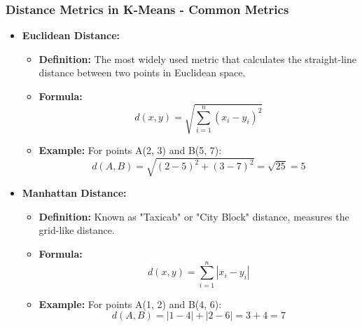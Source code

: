 \documentclass[aspectratio=169]{beamer}
\begin{document}
\begin{frame}[fragile]
    \frametitle{Distance Metrics in K-Means - Common Metrics}
    \begin{itemize}
        \item \textbf{Euclidean Distance:}
        \begin{itemize}
            \item \textbf{Definition:} The most widely used metric that calculates the straight-line distance between two points in Euclidean space.
            \item \textbf{Formula:}
            \begin{equation}
            d(x, y) = \sqrt{\sum_{i=1}^{n} (x_i - y_i)^2}
            \end{equation}
            \item \textbf{Example:} For points A(2, 3) and B(5, 7):
            \begin{equation}
            d(A, B) = \sqrt{(2-5)^2 + (3-7)^2} = \sqrt{25} = 5
            \end{equation}
        \end{itemize}
        
        \item \textbf{Manhattan Distance:}
        \begin{itemize}
            \item \textbf{Definition:} Known as "Taxicab" or "City Block" distance, measures the grid-like distance.
            \item \textbf{Formula:}
            \begin{equation}
            d(x, y) = \sum_{i=1}^{n} |x_i - y_i|
            \end{equation}
            \item \textbf{Example:} For points A(1, 2) and B(4, 6):
            \begin{equation}
            d(A, B) = |1-4| + |2-6| = 3 + 4 = 7
            \end{equation}
        \end{itemize}
    \end{itemize}
\end{frame}
\end{document}
